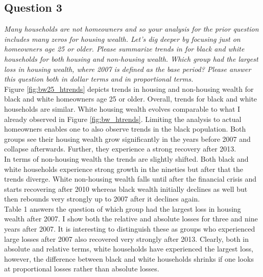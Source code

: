 \documentclass[]{scrartcl}
\begin{document}
\subsection*{Question 3}
\textit{Many households are not homeowners and so your analysis for the prior question includes many zeros
	for housing wealth. Let’s dig deeper by focusing just on homeowners age 25 or older. Please summarize
	trends in for black and white households for both housing and non-housing wealth. Which group had
	the largest loss in housing wealth, where 2007 is defined as the base period? Please answer this question
	both in dollar terms and in proportional terms.} \\

Figure \ref{fig:bw25_htrends} depicts trends in housing and non-housing wealth for black and white homeowners age 25 or older. Overall, trends for black and white households are similar. White housing wealth evolves comparable to what I already observed in Figure \ref{fig:bw_htrends}. Limiting the analysis to actual homeowners enables one to also observe trends in the black population. Both groups see their housing wealth grow significantly in the years before 2007 and collapse afterwards. Further, they experience a strong recovery after 2013. \\
In terms of non-housing wealth the trends are slightly shifted. Both black and white households experience strong growth in the nineties but after that the trends diverge. White non-housing wealth falls until after the financial crisis and starts recovering after 2010 whereas black wealth initially declines as well but then rebounds very strongly up to 2007 after it declines again. \\
Table 1 answers the question of which group had the largest loss in housing wealth after 2007. I show both the relative and absolute losses for three and nine years after 2007. It is interesting to distinguish these as groups who experienced large losses after 2007 also recovered very strongly after 2013. Clearly, both in absolute and relative terms, white households have experienced the largest loss, however, the difference between black and white households shrinks if one looks at proportional losses rather than absolute losses.
\end{document}

